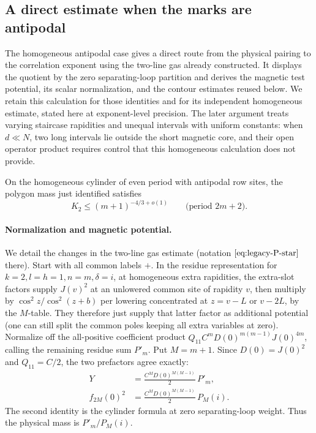 \subsection{A direct estimate when the marks are antipodal}\label{c6:subheading-16}

The homogeneous antipodal case gives a direct route from the physical
pairing to the correlation exponent using the two-line gas already
constructed.  It displays the quotient by the zero separating-loop
partition and derives the magnetic test potential, its scalar
normalization, and the contour estimates reused below.  We retain this
calculation for those identities and for its independent homogeneous
estimate, stated here at exponent-level precision.  The later argument
treats varying staircase rapidities and unequal intervals with uniform
constants: when $d\ll N$, two long intervals lie outside the short
magnetic core, and their open operator product requires control that
this homogeneous calculation does not provide.

On the homogeneous cylinder of even period with antipodal row sites, the polygon mass just identified satisfies
\[
 K_2 \le (m+1)^{-4/3+o(1)}\qquad\text{(period }2m+2\text{)} .
\]

\paragraph{Normalization and magnetic potential.}
We detail the changes in the two-line gas estimate (notation \(\eqref{eq:legacy-P-star}\) there). Start with all common labels \(+\). In the residue representation for \(k=2,l=h=1,n=m,\delta=i\), at homogeneous extra rapidities, the extra-slot factors supply \(J(v)^2\) at an unlowered common site of rapidity \(v\), then multiply by \(\cos^2 z/\cos^2(z+b)\) per lowering concentrated at \(z=v-L\) or \(v-2L\), by the \(M\)-table. They therefore just supply that latter factor as additional potential (one can still split the common poles keeping all extra variables at zero). Normalize off the all-positive coefficient product \(Q_{11} C^m D(0)^{m(m-1)}J(0)^{4m}\), calling the remaining residue sum \(P'_m\). Put \(M=m+1\). Since \(D(0)=J(0)^2\) and \(Q_{11}=C/2\), the two prefactors agree exactly:
\[
\begin{aligned}
 Y&=\frac{C^M D(0)^{M(M-1)}}2\,P'_m,\\
 f_{2M}(0)^2&=\frac{C^M D(0)^{M(M-1)}}2\,P_M(i).
\end{aligned}
\]
The second identity is the cylinder formula at zero separating-loop weight. Thus the physical mass is \(P'_m/P_M(i)\).

